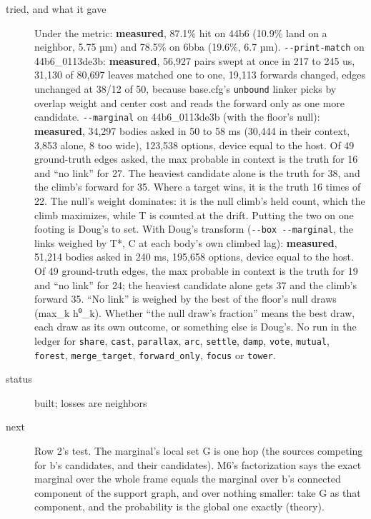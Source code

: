 \begin{description}
\item[{tried, and what it gave}] Under the metric: \textbf{measured}, 87.1\% hit on 44b6 (10.9\% land on a neighbor, 5.75 µm) and 78.5\% on 6bba (19.6\%, 6.7 µm). \texttt{-\allowbreak{}-\allowbreak{}print-\allowbreak{}match} on 44b6\_\allowbreak{}0113de3b: \textbf{measured}, 56,927 pairs swept at once in 217 to 245 us, 31,130 of 80,697 leaves matched one to one, 19,113 forwards changed, edges unchanged at 38/12 of 50, because base.cfg's \texttt{unbound} linker picks by overlap weight and center cost and reads the forward only as one more candidate. \texttt{-\allowbreak{}-\allowbreak{}marginal} on 44b6\_\allowbreak{}0113de3b (with the floor's null): \textbf{measured}, 34,297 bodies asked in 50 to 58 ms (30,444 in their context, 3,853 alone, 8 too wide), 123,538 options, device equal to the host. Of 49 ground-truth edges asked, the max probable in context is the truth for 16 and “no link” for 27. The heaviest candidate alone is the truth for 38, and the climb's forward for 35. Where a target wins, it is the truth 16 times of 22. The null's weight dominates: it is the null climb's held count, which the climb maximizes, while T is counted at the drift. Putting the two on one footing is Doug's to set. With Doug's transform (\texttt{-\allowbreak{}-\allowbreak{}box -\allowbreak{}-\allowbreak{}marginal}, the links weighed by T*, C at each body's own climbed lag): \textbf{measured}, 51,214 bodies asked in 240 ms, 195,658 options, device equal to the host. Of 49 ground-truth edges, the max probable in context is the truth for 19 and “no link” for 24; the heaviest candidate alone gets 37 and the climb's forward 35. “No link” is weighed by the best of the floor's null draws (max\_\allowbreak{}k h⁰\_\allowbreak{}k). Whether “the null draw's fraction” means the best draw, each draw as its own outcome, or something else is Doug's. No run in the ledger for \texttt{share}, \texttt{cast}, \texttt{parallax}, \texttt{arc}, \texttt{settle}, \texttt{damp}, \texttt{vote}, \texttt{mutual}, \texttt{forest}, \texttt{merge\_\allowbreak{}target}, \texttt{forward\_\allowbreak{}only}, \texttt{focus} or \texttt{tower}.
\item[{status}] built; losses are neighbors
\item[{next}] Row 2's test. The marginal's local set G is one hop (the sources competing for b's candidates, and their candidates). M6's factorization says the exact marginal over the whole frame equals the marginal over b's connected component of the support graph, and over nothing smaller: take G as that component, and the probability is the global one exactly (theory).
\end{description}

